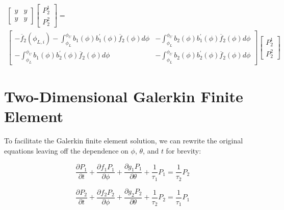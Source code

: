 \documentclass[12pt,a4paper,pagesize=pdftex]{scrartcl}
\begin{document}
\begin{multline*}
    \begin{bmatrix}
        y & y \\
        y & y
    \end{bmatrix}
    \begin{bmatrix}
        P_2^1 \\
        P_2^2
    \end{bmatrix}
    = \\
    \begin{bmatrix}
        - \overline{f}_2\left(\phi_{L,i}\right) - \int_{\phi_L}^{\phi_U} b_1\left(\phi\right) b_1^\prime\left(\phi\right) \overline{f}_2\left(\phi\right) d\phi & - \int_{\phi_L}^{\phi_U} b_2\left(\phi\right) b_1^\prime\left(\phi\right) \overline{f}_2\left(\phi\right) d\phi \\
        - \int_{\phi_L}^{\phi_U} b_1\left(\phi\right) b_2^\prime\left(\phi\right) \overline{f}_2\left(\phi\right) d\phi & -\int_{\phi_L}^{\phi_U} b_2\left(\phi\right) b_2^\prime \left(\phi\right) \overline{f}_2\left(\phi\right) d\phi
    \end{bmatrix}
    \begin{bmatrix}
        P_2^1 \\
        P_2^2
    \end{bmatrix}
\end{multline*}


\newpage
\section*{Two-Dimensional Galerkin Finite Element}
To facilitate the Galerkin finite element solution, we can rewrite the original equations leaving off the dependence on \(\phi\), \(\theta\), and \(t\) for brevity:

\begin{equation*}
    \frac{\partial P_1}{\partial t} + \frac{\partial f_1 P_1}{\partial \phi} + \frac{\partial g_1 P_1}{\partial \theta} + \frac{1}{\tau_1} P_1 = \frac{1}{\tau_2} P_2
\end{equation*}

\begin{equation*}
    \frac{\partial P_2}{\partial t} + \frac{\partial f_2 P_2}{\partial \phi} + \frac{\partial g_2 P_2}{\partial \theta} + \frac{1}{\tau_2} P_2 = \frac{1}{\tau_1} P_1
\end{equation*}
\end{document}
